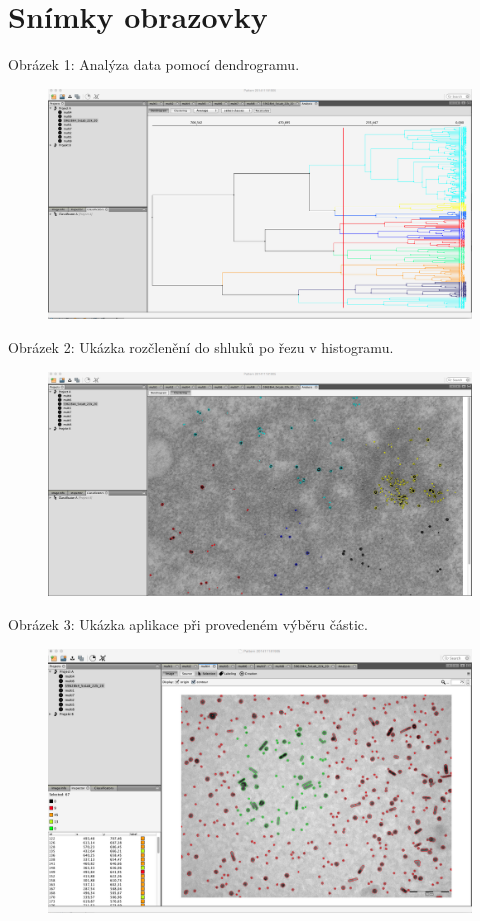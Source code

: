 \documentclass[11pt,twoside,a4paper,table]{book}
\begin{document}
\chapter{Snímky obrazovky}
\label{apend:screens}

\noindent Obrázek 1: Analýza data pomocí dendrogramu.
\begin{figure}
	\centering
	\includegraphics[scale=0.3, angle=90]{figures/app_cluster_analysis_dendrogram.png}
\end{figure}

\noindent Obrázek 2: Ukázka rozčlenění do shluků po řezu v histogramu.
\begin{figure}
	\centering
	\includegraphics[scale=0.3, angle=90]{figures/app_cluster_analysis_show.png}
\end{figure}

\noindent Obrázek 3: Ukázka aplikace při provedeném výběru částic.
\begin{figure}
	\centering
	\includegraphics[scale=0.3, angle=90]{figures/app_screen_selection.png}
\end{figure}
\end{document}
